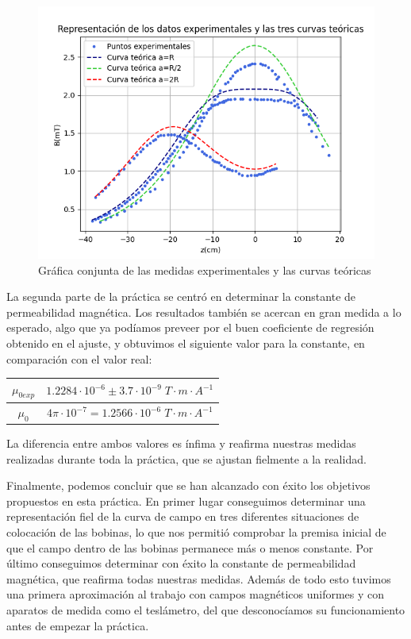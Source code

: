 \documentclass[a4paper,12pt,titlepage]{article}
\begin{document}
\begin{figure}[h!]
    \centering
    \includegraphics[width=0.95\linewidth]{Images/Tres curvas.png}
    \caption{Gráfica conjunta de las medidas experimentales y las curvas teóricas}
\end{figure}

\newpage

La segunda parte de la práctica se centró en determinar la constante de permeabilidad magnética. Los resultados también se acercan en gran medida a lo esperado, algo que ya podíamos preveer por el buen coeficiente de regresión obtenido en el ajuste, y obtuvimos el siguiente valor para la constante, en comparación con el valor real:
\begin{table}[h!]
    \centering
    \begin{tabular}{|c|c|}
        \hline
            $\mu_{0exp}$ & $1.2284 \cdot 10^{-6} \pm 3.7 \cdot 10^{-9} \; T \cdot m \cdot A^{-1}$ \\ \hline
            $\mu_0$ & $4\pi\cdot 10^{-7} = 1.2566 \cdot 10^{-6} \; T \cdot m \cdot A^{-1}$ \\ \hline
    \end{tabular}
\end{table}

La diferencia entre ambos valores es ínfima y reafirma nuestras medidas realizadas durante toda la práctica, que se ajustan fielmente a la realidad.

\par Finalmente, podemos concluir que se han alcanzado con éxito los objetivos propuestos en esta práctica. En primer lugar conseguimos determinar una representación fiel de la curva de campo en tres diferentes situaciones de colocación de las bobinas, lo que nos permitió comprobar la premisa inicial de que el campo dentro de las bobinas permanece más o menos constante. Por último conseguimos determinar con éxito la constante de permeabilidad magnética, que reafirma todas nuestras medidas. Además de todo esto tuvimos una primera aproximación al trabajo con campos magnéticos uniformes y con aparatos de medida como el teslámetro, del que desconocíamos su funcionamiento antes de empezar la práctica.
\end{document}
